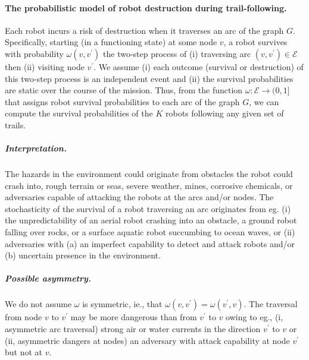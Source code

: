 \documentclass[11pt, oneside]{article}
\begin{document}
\paragraph{The probabilistic model of robot destruction during trail-following.} 
Each robot incurs a risk of destruction when it traverses an arc of the graph $G$.
Specifically, starting (in a functioning state) at some node $v$, a robot survives with probability $\omega(v, v^\prime)$ the two-step process of (i) traversing arc $(v, v^\prime) \in \mathcal{E}$ then (ii) visiting node $v^\prime$. 
We assume (i) each outcome (survival or destruction) of this two-step process is an independent event and (ii) the survival probabilities are static over the course of the mission. 
Thus, from the function $\omega: \mathcal{E} \rightarrow (0, 1]$ that assigns robot survival probabilities to each arc of the graph $G$, we can compute the survival probabilities of the $K$ robots following any given set of trails.



\vspace{-\baselineskip}
\subparagraph{Interpretation.} The hazards in the environment could originate from obstacles the robot could crash into, rough terrain or seas, severe weather, mines, corrosive chemicals, or adversaries capable of attacking the robots at the arcs and/or nodes.
The stochasticity of the survival of a robot traversing an arc originates from eg. (i) the unpredictability of an aerial robot crashing into an obstacle, a ground robot falling over rocks, or a surface aquatic robot succumbing to ocean waves, or (ii) adversaries with (a) an imperfect capability to detect and attack robots and/or (b) uncertain presence in the environment.

\vspace{-\baselineskip}
\subparagraph{Possible asymmetry.} We do not assume $\omega$ is symmetric, ie., that $\omega(v, v^\prime) = \omega(v^\prime, v)$. The traversal from node $v$ to $v^\prime$ may be more dangerous than from $v^\prime$ to $v$ owing to eg., (i, asymmetric arc traversal) strong air or water currents in the direction $v^\prime$ to $v$ or (ii, asymmetric dangers at nodes) an adversary with attack capability at node $v^\prime$ but not at $v$. %
\end{document}
